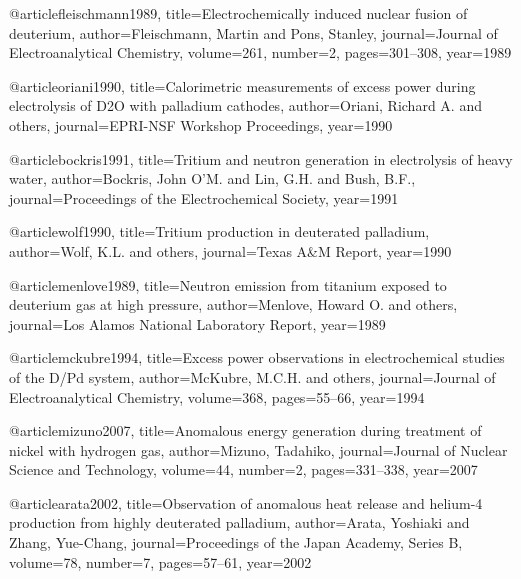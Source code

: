     
    
    
    
    
    @article{fleischmann1989,
      title={Electrochemically induced nuclear fusion of deuterium},
      author={Fleischmann, Martin and Pons, Stanley},
      journal={Journal of Electroanalytical Chemistry},
      volume={261},
      number={2},
      pages={301--308},
      year={1989}
    }
    
    @article{oriani1990,
      title={Calorimetric measurements of excess power during electrolysis of D2O with palladium cathodes},
      author={Oriani, Richard A. and others},
      journal={EPRI-NSF Workshop Proceedings},
      year={1990}
    }
    
    @article{bockris1991,
      title={Tritium and neutron generation in electrolysis of heavy water},
      author={Bockris, John O'M. and Lin, G.H. and Bush, B.F.},
      journal={Proceedings of the Electrochemical Society},
      year={1991}
    }
    
    @article{wolf1990,
      title={Tritium production in deuterated palladium},
      author={Wolf, K.L. and others},
      journal={Texas A\&M Report},
      year={1990}
    }
    
    @article{menlove1989,
      title={Neutron emission from titanium exposed to deuterium gas at high pressure},
      author={Menlove, Howard O. and others},
      journal={Los Alamos National Laboratory Report},
      year={1989}
    }
    
    @article{mckubre1994,
      title={Excess power observations in electrochemical studies of the D/Pd system},
      author={McKubre, M.C.H. and others},
      journal={Journal of Electroanalytical Chemistry},
      volume={368},
      pages={55--66},
      year={1994}
    }
    
    @article{mizuno2007,
      title={Anomalous energy generation during treatment of nickel with hydrogen gas},
      author={Mizuno, Tadahiko},
      journal={Journal of Nuclear Science and Technology},
      volume={44},
      number={2},
      pages={331--338},
      year={2007}
    }
    
    @article{arata2002,
      title={Observation of anomalous heat release and helium-4 production from highly deuterated palladium},
      author={Arata, Yoshiaki and Zhang, Yue-Chang},
      journal={Proceedings of the Japan Academy, Series B},
      volume={78},
      number={7},
      pages={57--61},
      year={2002}
    }
    
